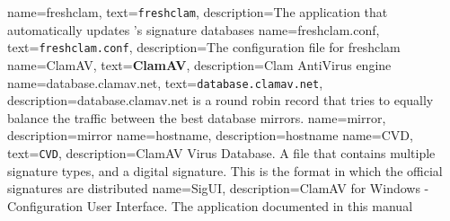 {
    name={freshclam},
    text={\texttt{freshclam}},
    description={The application that automatically updates \ClamAV's signature databases}
}
{
    name={freshclam.conf},
    text={\texttt{freshclam.conf}},
    description={The configuration file for \gls{freshclam}}
}
{
    name={ClamAV},
    text={\textbf{ClamAV}},
    description={Clam AntiVirus engine}
}
{
    name={database.clamav.net},
    text={\texttt{database.clamav.net}},
    description={database.clamav.net is a round robin record that tries to
	equally balance the traffic between the best database mirrors.}
}
{
    name={mirror},
    description={mirror}
}
{
    name={hostname},
    description={hostname}
}
{
    name={CVD},
    text={\texttt{CVD}},
    description={ClamAV Virus Database. A file that contains multiple signature types, and a digital signature.
	This is the format in which the official signatures are distributed}
}
{
    name={SigUI},
    description={ClamAV for Windows - Configuration User Interface. The
	application documented in this manual}
}
